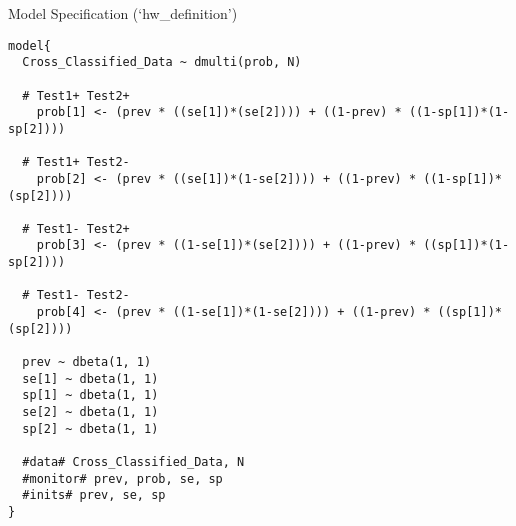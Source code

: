 \documentclass[
  ignorenonframetext,
]{beamer}
\begin{document}
\begin{frame}[fragile]
\begin{block}{Model Specification (`hw\_definition')}
\protect\hypertarget{model-specification-hw_definition}{}
\scriptsize

\begin{verbatim}
model{
  Cross_Classified_Data ~ dmulti(prob, N)
  
  # Test1+ Test2+
    prob[1] <- (prev * ((se[1])*(se[2]))) + ((1-prev) * ((1-sp[1])*(1-sp[2])))
  
  # Test1+ Test2-
    prob[2] <- (prev * ((se[1])*(1-se[2]))) + ((1-prev) * ((1-sp[1])*(sp[2])))

  # Test1- Test2+
    prob[3] <- (prev * ((1-se[1])*(se[2]))) + ((1-prev) * ((sp[1])*(1-sp[2])))

  # Test1- Test2-
    prob[4] <- (prev * ((1-se[1])*(1-se[2]))) + ((1-prev) * ((sp[1])*(sp[2])))

  prev ~ dbeta(1, 1)
  se[1] ~ dbeta(1, 1)
  sp[1] ~ dbeta(1, 1)
  se[2] ~ dbeta(1, 1)
  sp[2] ~ dbeta(1, 1)

  #data# Cross_Classified_Data, N
  #monitor# prev, prob, se, sp
  #inits# prev, se, sp
}
\end{verbatim}

\normalsize
\end{block}
\end{frame}
\end{document}
